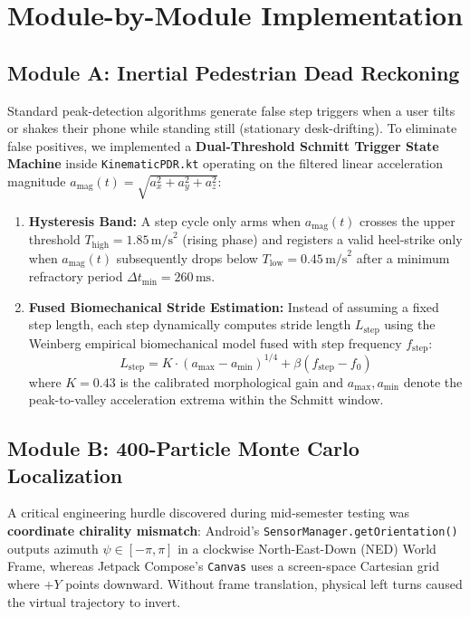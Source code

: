 \documentclass[11pt,a4paper]{article}
\begin{document}
\section{Module-by-Module Implementation}

\subsection{Module A: Inertial Pedestrian Dead Reckoning}
Standard peak-detection algorithms generate false step triggers when a user tilts or shakes their phone while standing still (stationary desk-drifting). To eliminate false positives, we implemented a \textbf{Dual-Threshold Schmitt Trigger State Machine} inside \texttt{KinematicPDR.kt} operating on the filtered linear acceleration magnitude $a_{\text{mag}}(t) = \sqrt{a_x^2 + a_y^2 + a_z^2}$:
\begin{enumerate}
    \item \textbf{Hysteresis Band:} A step cycle only arms when $a_{\text{mag}}(t)$ crosses the upper threshold $T_{\text{high}} = 1.85\,\text{m/s}^2$ (rising phase) and registers a valid heel-strike only when $a_{\text{mag}}(t)$ subsequently drops below $T_{\text{low}} = 0.45\,\text{m/s}^2$ after a minimum refractory period $\Delta t_{\text{min}} = 260\,\text{ms}$.
    \item \textbf{Fused Biomechanical Stride Estimation:} Instead of assuming a fixed step length, each step dynamically computes stride length $L_{\text{step}}$ using the Weinberg empirical biomechanical model fused with step frequency $f_{\text{step}}$:
    \begin{equation}
        L_{\text{step}} = K \cdot \left( a_{\max} - a_{\min} \right)^{1/4} + \beta (f_{\text{step}} - f_0)
    \end{equation}
    where $K = 0.43$ is the calibrated morphological gain and $a_{\max}, a_{\min}$ denote the peak-to-valley acceleration extrema within the Schmitt window.
\end{enumerate}

\subsection{Module B: 400-Particle Monte Carlo Localization}
A critical engineering hurdle discovered during mid-semester testing was \textbf{coordinate chirality mismatch}: Android's \texttt{SensorManager.getOrientation()} outputs azimuth $\psi \in [-\pi, \pi]$ in a clockwise North-East-Down (NED) World Frame, whereas Jetpack Compose's \texttt{Canvas} uses a screen-space Cartesian grid where $+Y$ points downward. Without frame translation, physical left turns caused the virtual trajectory to invert.
\end{document}
